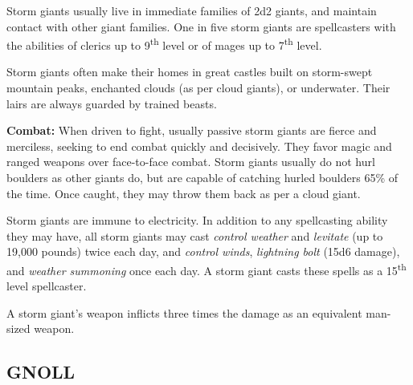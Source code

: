 \begin{multicols}{2}
Storm giants usually live in immediate families of 2d2 giants, and maintain contact with other giant families. One in five storm giants are spellcasters with the abilities of clerics up to 9\textsuperscript{th} level or of mages up to 7\textsuperscript{th} level. 

Storm giants often make their homes in great castles built on storm-swept mountain peaks, enchanted clouds (as per cloud giants), or underwater. Their lairs are always guarded by trained beasts.

\textbf{Combat:} When driven to fight, usually passive storm giants are fierce and merciless, seeking to end combat quickly and decisively. They favor magic and ranged weapons over face-to-face combat. Storm giants usually do not hurl boulders as other giants do, but are capable of catching hurled boulders 65\% of the time. Once caught, they may throw them back as per a cloud giant.

Storm giants are immune to electricity. In addition to any spellcasting ability they may have, all storm giants may cast \textit{control weather} and \textit{levitate} (up to 19,000 pounds) twice each day, and \textit{control winds}, \textit{lightning bolt} (15d6 damage), and \textit{weather summoning} once each day. A storm giant casts these spells as a 15\textsuperscript{th} level spellcaster.

A storm giant's weapon inflicts three times the damage as an equivalent man-sized weapon.

\noindent
\begin{minipage}{\columnwidth}

\vspace{1em}

\subsection{GNOLL}


\end{minipage}
\end{multicols}
